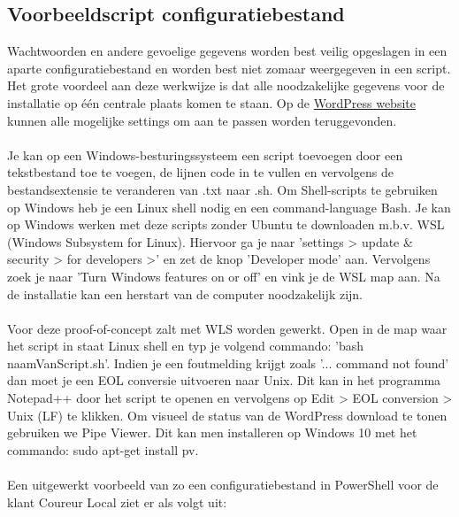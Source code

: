 \subsection{Voorbeeldscript configuratiebestand}
Wachtwoorden en andere gevoelige gegevens worden best veilig opgeslagen in een aparte configuratiebestand en worden best niet zomaar weergegeven in een script. Het grote voordeel aan deze werkwijze is dat alle noodzakelijke gegevens voor de installatie op één centrale plaats komen te staan. Op de \href{https://wordpress.org/documentation/article/settings-general-screen/}{WordPress website} kunnen alle mogelijke settings om aan te passen worden teruggevonden.
\\\\
Je kan op een Windows-besturingssysteem een script toevoegen door een tekstbestand toe te voegen, de lijnen code in te vullen en vervolgens de bestandsextensie te veranderen van .txt naar .sh. Om Shell-scripts te gebruiken op Windows heb je een Linux shell nodig en een command-language Bash. Je kan op Windows werken met deze scripts zonder Ubuntu te downloaden m.b.v. WSL (Windows Subsystem for Linux). Hiervoor ga je naar 'settings > update \& security > for developers >' en zet de knop 'Developer mode' aan. Vervolgens zoek je naar 'Turn Windows features on or off' en vink je de WSL map aan. Na de installatie kan een herstart van de computer noodzakelijk zijn. 
\\\\
Voor deze proof-of-concept zalt met WLS worden gewerkt. Open in de map waar het script in staat Linux shell en typ je volgend commando: 'bash naamVanScript.sh'. Indien je een foutmelding krijgt zoals '... command not found' dan moet je een EOL conversie uitvoeren naar Unix. Dit kan in het programma Notepad++ door het script te openen en vervolgens op Edit > EOL conversion > Unix (LF) te klikken. Om visueel de status van de WordPress download te tonen gebruiken we Pipe Viewer. Dit kan men installeren op Windows 10 met het commando: sudo apt-get install pv.
\\\\
Een uitgewerkt voorbeeld van zo een configuratiebestand in PowerShell voor de klant Coureur Local ziet er als volgt uit:
